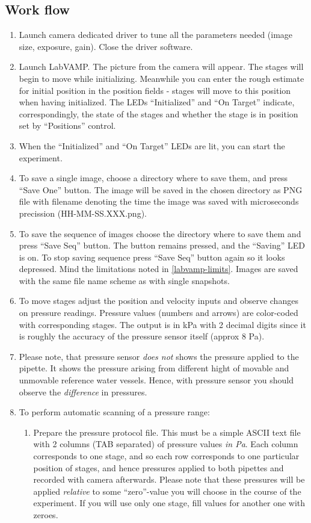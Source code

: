 \subsection{Work flow}\label{labvamp-work}
\begin{enumerate}
	\item Launch camera dedicated driver to tune all the parameters needed (image size, exposure, gain). Close the driver software.
	\item Launch LabVAMP. The picture from the camera will appear. The stages will begin to move while initializing. Meanwhile you can enter the rough estimate for initial position in the position fields - stages will move to this position when having initialized. The LEDs ``Initialized'' and ``On Target'' indicate, correspondingly, the state of the stages and whether the stage is in position set by ``Positions'' control.
	\item When the ``Initialized'' and ``On Target'' LEDs are lit, you can start the experiment.
	\item To save a single image, choose a directory where to save them, and press ``Save One'' button. The image will be saved in the chosen directory as PNG file with filename denoting the time the image was saved with microseconds precission (HH-MM-SS.XXX.png).
	\item To save the sequence of images choose the directory where to save them and press ``Save Seq'' button. The button remains pressed, and the ``Saving'' LED is on. To stop saving sequence press ``Save Seq'' button again so it looks depressed. Mind the limitations noted in \ref{labvamp-limits}. Images are saved with the same file name scheme as with single snapshots.
	\item To move stages adjust the position and velocity inputs and observe changes on pressure readings. Pressure values (numbers and arrows) are color-coded with corresponding stages. The output is in kPa with 2 decimal digits since it is roughly the accuracy of the pressure sensor itself (approx 8 Pa).
	\item Please note, that pressure sensor \emph{does not} shows the pressure applied to the pipette. It shows the pressure arising from different hight of movable and unmovable reference water vessels. Hence, with pressure sensor you should observe the \emph{difference} in pressures.
	\item To perform automatic scanning of a pressure range:
	\begin{enumerate}
		\item Prepare the pressure protocol file. This must be a simple ASCII text file with 2 columns (TAB separated) of pressure values \emph{in Pa}. Each column corresponds to one stage, and so each row corresponds to one particular position of stages, and hence pressures applied to both pipettes and recorded with camera afterwards. Please note that these pressures will be applied \emph{relative} to some ``zero''-value you will choose in the course of the experiment. If you will use only one stage, fill values for another one with zeroes.

\end{enumerate}
\end{enumerate}
